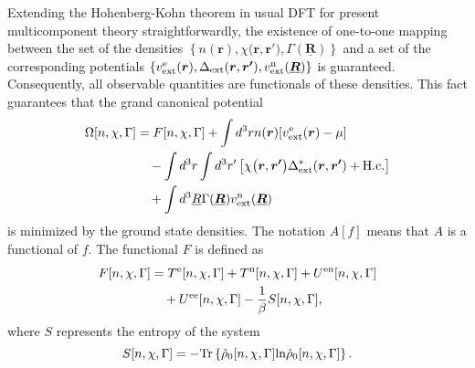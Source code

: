 Extending the Hohenberg-Kohn theorem in usual DFT for present multicomponent theory straightforwardly, 
the existence of one-to-one mapping between the set of the densities $ \left\{ n(\bm{r}), \chi \bigl(\bm{r}, \bm{r'} \bigr), 
\Gamma(\underline{\bm{R}}) \right\}$ and a set of the corresponding potentials 
$ \left\{ v^{\rm e}_{\rm ext}(\bm{r}), \Delta_\mathrm{ext}(\bm{r}, \bm{r'}), v^{\rm n}_{\rm ext}(\underline{\bm{R}}) \right\}$
is guaranteed.
Consequently, all observable quantities are functionals of these densities. 
This fact guarantees that the grand canonical potential 
%
\begin{equation}  %
\begin{split}
	\label{eq:grand_pot}
	\Omega[n, \chi, \Gamma] &= F[n, \chi, \Gamma] + \int d^3r n(\bm{r})[v^{\rm e}_{\rm ext}(\bm{r}) - \mu] \\
	                                    &\quad- \int d^3r \int d^3r' \left[\chi \bigl(\bm{r}, \bm{r'} \bigr)
	                                       \Delta^{\ast}_\mathrm{ext}(\bm{r}, \bm{r'}) + {\rm H.c.} \right]\\
	                     &\quad+ \int d^3\underline{R} \Gamma(\underline{\bm{R}})v^{\rm n}_{\rm ext}(\underline{\bm{R}})
\end{split}
\end{equation}
%
is minimized by the ground state densities. The notation $A[f]$ means that $A$ is a functional of $f$.
The functional $F$ is defined as
%
\begin{equation} %
\label{eq:Free_int}
\begin{split}
	F[n, \chi, \Gamma] &= T^{\rm e}[n, \chi, \Gamma] + T^{\rm n}[n, \chi, \Gamma] + U^{\rm en}[n, \chi, \Gamma] \\
	                                  &\quad + U^{\rm ee}[n, \chi, \Gamma] - \frac{1}{\beta}S[n, \chi, \Gamma],
\end{split}
\end{equation}
%
where $S$ represents the entropy of the system
%
\begin{equation}
	S[n, \chi, \Gamma] = -{\rm Tr}\left\{\hat{\rho}_0 [n, \chi, \Gamma]{\rm ln}\hat{\rho}_0 [n, \chi, \Gamma] \right\}.
\end{equation}
%

